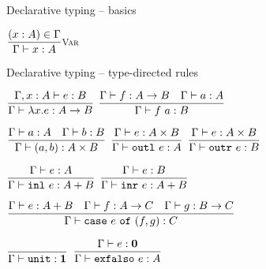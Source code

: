 \documentclass{beamer}
\begin{document}
\begin{frame}{Declarative typing -- basics}

\begin{center}
  $\infrule[Var]{\sidecond{(x : A) \in \Gamma}}{\typing{x}{A}}$
\end{center}

\end{frame}

\begin{frame}{Declarative typing -- type-directed rules}

\begin{center}
  $\infrule{\fulltyping{\extend{\Gamma}{x}{A}}{e}{B}}{\typing{\fun{x}{e}}{\Fun{A}{B}}}$ \quad
  $\infrule{\typing{f}{\Fun{A}{B}} \quad \typing{a}{A}}{\typing{\app{f}{a}}{B}}$

  \vspace{2em}

  $\infrule{\typing{a}{A} \quad \typing{b}{B}}{\typing{\pair{a}{b}}{\Prod{A}{B}}}$ \quad
  $\infrule{\typing{e}{\Prod{A}{B}}}{\typing{\outl{e}}{A}}$ \quad
  $\infrule{\typing{e}{\Prod{A}{B}}}{\typing{\outr{e}}{B}}$

  \vspace{2em}

  $\infrule{\typing{e}{A}}{\typing{\inl{e}}{\Sum{A}{B}}}$ \quad
  $\infrule{\typing{e}{B}}{\typing{\inr{e}}{\Sum{A}{B}}}$

  \vspace{2em}

  $\infrule{\typing{e}{\Sum{A}{B}} \quad \typing{f}{\Fun{A}{C}} \quad \typing{g}{\Fun{B}{C}}}{\typing{\case{e}{f}{g}}{C}}$

  \vspace{2em}

  $\infrule{}{\typing{\unit}{\Unit}}$ \quad
  $\infrule{\typing{e}{\Empty}}{\typing{\exfalso{e}}{A}}$
\end{center}

\end{frame}
\end{document}
